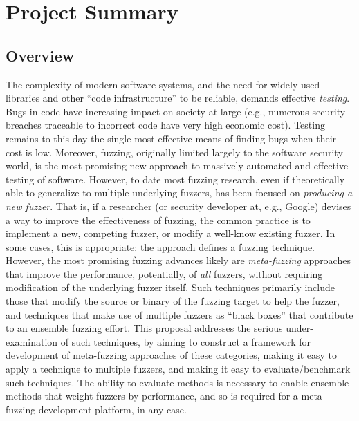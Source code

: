 \section{Project Summary}
\subsection*{Overview}
\vspace{-2mm}


The complexity of modern software systems, and the need for widely used 
libraries and other ``code infrastructure'' to be reliable, demands effective 
\emph{testing}.  Bugs in code have increasing impact on society at large (e.g., 
numerous security breaches traceable to incorrect code have very high economic 
cost).  Testing remains to this day the single most effective means of finding 
bugs when their cost is low.   Moreover, fuzzing, originally limited largely to 
the software security world, is the most promising new approach to massively 
automated and effective testing of software.   However, to date most fuzzing 
research, even if theoretically able to generalize to multiple underlying 
fuzzers, has been focused on \emph{producing a new fuzzer}.  That is, if a 
researcher (or security developer at, e.g., Google) devises a way to improve 
the effectiveness of fuzzing, the common practice is to implement a new, 
competing fuzzer, or modify a well-know existing fuzzer.  In some cases, this 
is appropriate: the approach defines a fuzzing technique.  However, the most 
promising fuzzing advances likely are \emph{meta-fuzzing} approaches that 
improve the performance, potentially, of \emph{all} fuzzers, without requiring 
modification of the underlying fuzzer itself.  Such techniques primarily 
include those that modify the source or binary of the fuzzing target to help 
the fuzzer, and techniques that make use of multiple fuzzers as ``black boxes'' 
that contribute to an ensemble fuzzing effort.  This proposal addresses the 
serious under-examination of such techniques, by aiming to construct a 
framework for development of meta-fuzzing approaches of these categories, 
making it easy to apply a technique to multiple fuzzers, and making it easy to 
evaluate/benchmark such techniques.  The ability to evaluate methods is 
necessary to enable ensemble methods that weight fuzzers by performance, and so 
is required for a meta-fuzzing development platform, in any case.

